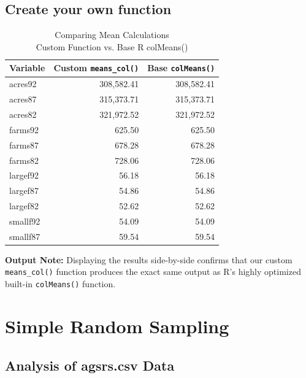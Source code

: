 \documentclass[
  letterpaper,
  DIV=11,
  numbers=noendperiod]{scrreprt}
\renewcommand{\[}{\begin{equation}}
\renewcommand{\]}{\end{equation}}
\begin{document}
\section{Create your own function}\label{create-your-own-function}

\begin{table}
\caption*{
{\fontsize{20}{25}\selectfont  Comparing Mean Calculations\fontsize{12}{15}\selectfont } \\ 
{\fontsize{14}{17}\selectfont  Custom Function vs. Base R colMeans()\fontsize{12}{15}\selectfont }
} 
\fontsize{12.0pt}{14.0pt}\selectfont
\begin{tabular*}{\linewidth}{@{\extracolsep{\fill}}lrr}
\toprule
\textbf{Variable} & \textbf{Custom \texttt{means\_col()}} & \textbf{Base \texttt{colMeans()}} \\ 
\midrule\addlinespace[2.5pt]
acres92 & 308,582.41 & 308,582.41 \\ 
acres87 & 315,373.71 & 315,373.71 \\ 
acres82 & 321,972.52 & 321,972.52 \\ 
farms92 & 625.50 & 625.50 \\ 
farms87 & 678.28 & 678.28 \\ 
farms82 & 728.06 & 728.06 \\ 
largef92 & 56.18 & 56.18 \\ 
largef87 & 54.86 & 54.86 \\ 
largef82 & 52.62 & 52.62 \\ 
smallf92 & 54.09 & 54.09 \\ 
smallf87 & 59.54 & 59.54 \\ 
\bottomrule
\end{tabular*}
\end{table}

\textbf{Output Note:} Displaying the results side-by-side confirms that
our custom \texttt{means\_col()} function produces the exact same output
as R's highly optimized built-in \texttt{colMeans()} function.


\chapter{Simple Random Sampling}\label{simple-random-sampling}

\section{Analysis of agsrs.csv Data}\label{analysis-of-agsrs.csv-data}
\end{document}

